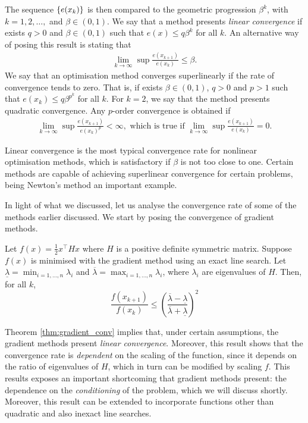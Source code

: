 The sequence $\left\{ e(x_k) \right \}$ is then compared to the geometric progression $\beta^k$, with $k=1,2,\dots,$ and $\beta \in (0,1)$. We say that a method presents \emph{linear convergence} if exists $q > 0$ and $\beta \in (0,1)$ such that $e(x) \leq q\beta^k$ for all $k$. An alternative way of posing this result is stating that
%
\begin{align*}
	\lim_{k\rightarrow\infty} \sup \frac{e(x_{k+1})}{e(x_k)} \leq \beta.
\end{align*}
%
We say that an optimisation method converges superlinearly if the rate of convergence tends to zero. That is, if exists $\beta \in (0,1)$, $q > 0$ and $p > 1$ such that $e(x_k) \leq q\beta^{p^k}$ for all $k$. For $k=2$, we say that the method presents quadratic convergence. Any $p$-order convergence is obtained if 
%
\begin{align*}
	\lim_{k\rightarrow\infty} \sup \frac{e(x_{k+1})}{e(x_k)^p} < \infty, \text{ which is true if }
\lim_{k\rightarrow\infty} \sup \frac{e(x_{k+1})}{e(x_k)} = 0	.
\end{align*}

Linear convergence is the most typical convergence rate for nonlinear optimisation methods, which is satisfactory if $\beta$ is not too close to one. Certain methods are capable of achieving superlinear convergence for certain problems, being Newton's method an important example.

In light of what we discussed, let us analyse the convergence rate of some of the methods earlier discussed. We start by posing the convergence of gradient methods.
%
\begin{theorem} \label{thm:gradient_conv}
Let $f(x) = \frac{1}{2}x^\top Hx$ where $H$ is a positive definite symmetric matrix. Suppose $f(x)$ is minimised with the gradient method using an exact line search. Let $\underline{\lambda} = \min_{i=1,\dots,n}\lambda_i$ and $\overline{\lambda} = \max_{i=1,\dots,n}\lambda_i$, where $\lambda_i$ are eigenvalues of $H$. Then, for all $k$,
$$ \frac{f(x_{k+1})}{f(x_k)} \leq \left(\frac{\overline{\lambda}-\underline{\lambda}}{\overline{\lambda}+\underline{\lambda}}\right)^2
$$
\end{theorem}

Theorem \ref{thm:gradient_conv} implies that, under certain assumptions, the gradient methods present \emph{linear convergence}. Moreover, this result shows that the convergence rate is \emph{dependent} on the scaling of the function, since it depends on the ratio of eigenvalues of $H$, which in turn can be modified by scaling $f$. This results exposes an important shortcoming that gradient methods present: the dependence on the \emph{conditioning} of the problem, which we will discuss shortly. Moreover, this result can be extended to incorporate functions other than quadratic and also inexact line searches. 

